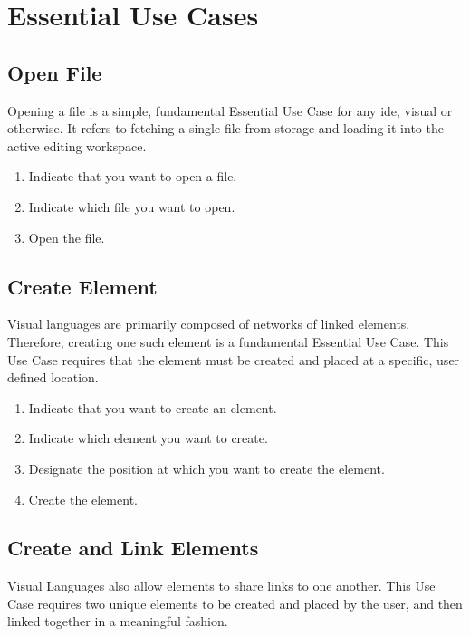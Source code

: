 \section{Essential Use Cases}

\subsection{Open File}
\label{app:euc_open}

Opening a file is a simple, fundamental Essential Use Case for any
\ac{ide}, visual or otherwise. It refers to fetching a single file from
storage and loading it into the active editing workspace.

\begin{enumerate}
  \item Indicate that you want to open a file.
  \item Indicate which file you want to open.
  \item Open the file.
\end{enumerate}

\subsection{Create Element}
\label{app:euc_create}

Visual languages are primarily composed of networks of linked elements.
Therefore, creating one such element is a fundamental Essential Use Case.
This Use Case requires that the element must be created and placed at a
specific, user defined location.

\begin{enumerate}
  \item Indicate that you want to create an element.
  \item Indicate which element you want to create.
  \item Designate the position at which you want to create the element.
  \item Create the element.
\end{enumerate}

\subsection{Create and Link Elements}
\label{app:euc_create_link}

Visual Languages also allow elements to share links to one another. This
Use Case requires two unique elements to be created and placed by the user,
and then linked together in a meaningful fashion.

